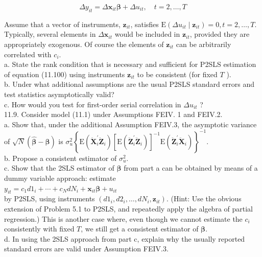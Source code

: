 \documentclass[10pt]{article}
\begin{document}
\begin{equation*}
\Delta y_{i t}=\Delta \mathbf{x}_{i t} \boldsymbol{\beta}+\Delta u_{i t}, \quad t=2, \ldots, T \tag{11.100}
\end{equation*}


Assume that a vector of instruments, $\mathbf{z}_{i t}$, satisfies $\mathrm{E}\left(\Delta u_{i t} \mid \mathbf{z}_{i t}\right)=0, t=2, \ldots, T$. Typically, several elements in $\Delta \mathbf{x}_{i t}$ would be included in $\mathbf{z}_{i t}$, provided they are appropriately exogenous. Of course the elements of $\mathbf{z}_{i t}$ can be arbitrarily correlated with $c_{i}$.\\
a. State the rank condition that is necessary and sufficient for P2SLS estimation of equation (11.100) using instruments $\mathbf{z}_{i t}$ to be consistent (for fixed $T$ ).\\
b. Under what additional assumptions are the usual P2SLS standard errors and test statistics asymptotically valid?\\
c. How would you test for first-order serial correlation in $\Delta u_{i t}$ ?\\
11.9. Consider model (11.1) under Assumptions FEIV. 1 and FEIV.2.\\
a. Show that, under the additional Assumption FEIV.3, the asymptotic variance of $\sqrt{N}(\hat{\boldsymbol{\beta}}-\boldsymbol{\beta})$ is $\sigma_{u}^{2}\left\{\mathrm{E}\left(\ddot{\mathbf{X}}_{i}^{\prime} \ddot{\mathbf{Z}}_{i}\right)\left[\mathrm{E}\left(\ddot{\mathbf{Z}}_{i}^{\prime} \ddot{\mathbf{Z}}_{i}\right)\right]^{-1} \mathrm{E}\left(\ddot{\mathbf{Z}}_{i}^{\prime} \ddot{\mathbf{X}}_{i}\right)\right\}^{-1}$.\\
b. Propose a consistent estimator of $\sigma_{u}^{2}$.\\
c. Show that the 2SLS estimator of $\boldsymbol{\beta}$ from part a can be obtained by means of a dummy variable approach: estimate\\
$y_{i t}=c_{1} d 1_{i}+\cdots+c_{N} d N_{i}+\mathbf{x}_{i t} \boldsymbol{\beta}+u_{i t}$\\
by P2SLS, using instruments $\left(d 1_{i}, d 2_{i}, \ldots, d N_{i}, \mathbf{z}_{i t}\right)$. (Hint: Use the obvious extension of Problem 5.1 to P2SLS, and repeatedly apply the algebra of partial regression.) This is another case where, even though we cannot estimate the $c_{i}$ consistently with fixed $T$, we still get a consistent estimator of $\boldsymbol{\beta}$.\\
d. In using the 2SLS approach from part c, explain why the usually reported standard errors are valid under Assumption FEIV.3.\\
\end{document}
